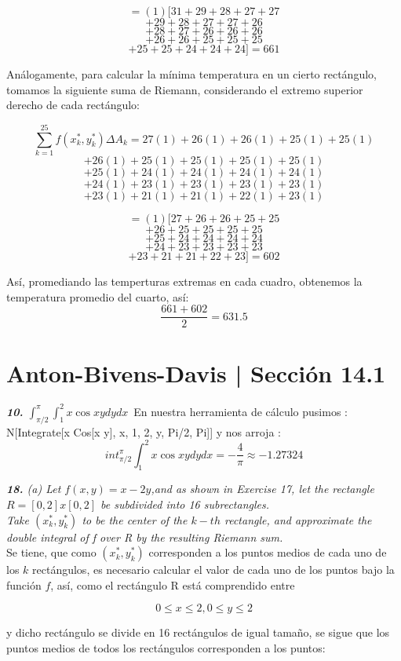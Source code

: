 \documentclass[a4paper,12pt]{article}
\begin{document}
\begin{itemize}
		$$ = (1) [31 + 29 + 28 + 27 + 27  $$
   		$$ + 29 + 28 + 27 + 27 + 26 $$
   		$$ + 28 + 27 + 26 + 26 + 26 $$
   		$$ + 26 + 26 + 25 + 25 + 25 $$
   		$$ + 25 + 25 + 24 + 24 + 24]  = 661$$

	Análogamente, para calcular la mínima temperatura en un cierto rectángulo,
	tomamos la siguiente suma de Riemann, considerando el extremo superior
	derecho de cada rectángulo:

	$$ \sum_{k=1}^{25} f(x^{*}_{k}, y^{*}_{k}) \Delta A_{k} =
		 27(1) + 26(1) + 26(1) + 25(1) + 25(1)  $$
	$$ + 26(1) + 25(1) + 25(1) + 25(1) + 25(1) $$
	$$ + 25(1) + 24(1) + 24(1) + 24(1) + 24(1) $$
	$$ + 24(1) + 23(1) + 23(1) + 23(1) + 23(1) $$
	$$ + 23(1) + 21(1) + 21(1) + 22(1) + 23(1) $$

	$$ = (1) [27 + 26 + 26 + 25 + 25  $$
	$$ + 26 + 25 + 25 + 25 + 25 $$
	$$ + 25 + 24 + 24 + 24 + 24 $$
	$$ + 24 + 23 + 23 + 23 + 23 $$
	$$ + 23 + 21 + 21 + 22 + 23] = 602 $$

	Así, promediando las temperturas extremas en cada cuadro, obtenemos la temperatura
	promedio del cuarto, así:
		$$ \frac{661 + 602}{2} = 631.5$$

\end{itemize}
	\section{Anton-Bivens-Davis | Sección 14.1}
	\textit{\textbf{10.} $\int^{\pi}_{\pi / 2}\int^2_1 x \cos xy dy dx$}\
En nuestra herramienta de cálculo pusimos :
N[Integrate[x Cos[x y], {x, 1, 2}, {y, Pi/2, Pi}]] y nos arroja :
\[int^{\pi}_{\pi /2}\int^2_1 x \cos xy dy dx = - \dfrac{4}{\pi} \approx -1.27324\]

	\textit{\textbf{18.} (a) Let $f(x,y) = x - 2y$,and as shown in Exercise 17,
	let the rectangle $ R = [0, 2] x [0, 2]$ be subdivided into 16 subrectangles.\\
	\newline
	Take $(x^{*}_{k}, y^{*}_{k})$ to be the center of the $k-th$ rectangle, and approximate
	the double integral of f over R by the resulting Riemann sum.}\\

	Se tiene, que como $(x^{*}_{k}, y^{*}_{k})$ corresponden a los puntos medios
	de cada uno de los $k$ rectángulos, es necesario calcular el valor de cada
	uno de los puntos bajo la función $f$, así, como el rectángulo R está
	comprendido entre

		$$ 0 \leq x \leq 2, 0 \leq y \leq 2  $$

	y dicho rectángulo se divide en 16 rectángulos de igual tamaño, se sigue que
	los puntos medios de todos los rectángulos corresponden a los puntos:
\end{document}
